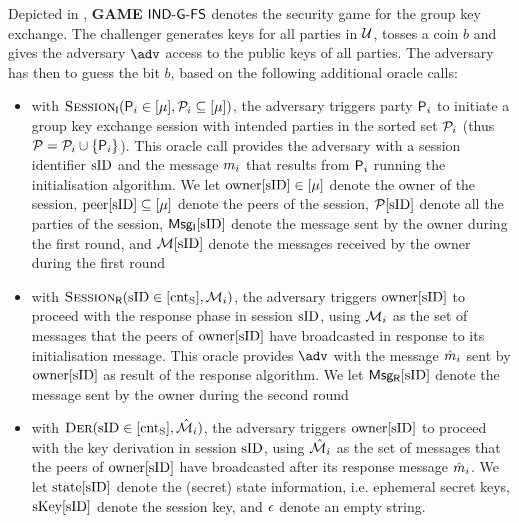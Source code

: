 Depicted in , {\textbf{GAME} $\GIAKEsecurityPFSGame$} denotes the security game for the group key exchange. 
The challenger generates keys for all parties in $\Universe$, tosses a coin $b$ and gives the adversary $\adv$ access to the public keys of all parties.
The adversary has then to guess the bit $b$, based on the following additional oracle calls:
\begin{itemize}
	\item with $\GakeIniO ( \GIni  \in [\mu], \PartySet_{i} \subseteq [\mu])$, the adversary triggers party $\User[i]$ to initiate a group key exchange session with intended parties in the sorted set $\PartySet_{i}$ (thus $\PartySet = \PartySet_{i}  \cup \{\User[i]\}$). This oracle call provides the adversary with a session identifier $\sID$ and the message $\GakeIniMes_{i}$ that results from $\User[i]$ running the initialisation algorithm. We let $\owner[\sID] \in [\mu]$ denote the owner of the session, $\peer[\sID] \subseteq[\mu]$ denote the peers of the session, $\GakeUSet[\sID]$ denote all the parties of the session, $\GIniMes[\sID]$ denote the message sent by the owner during the first round, and $\GIniMesSet[\sID]$ denote the messages received by the owner during the first round
	\item with $\GakeResO(\sID \in [\cntS], \GakeIniMesSet[{i}] )$, the adversary triggers $\owner[\sID]$ to proceed with the response phase in session $\sID$, using $\GakeIniMesSet[i]$ as the set of messages that the peers of $\owner[\sID]$ have broadcasted in response to its initialisation message. This oracle provides $\adv$ with the message $\GakeResMes_{i}$ sent by $\owner[\sID]$ as result of the response algorithm. We let $\GResMes[\sID]$ denote the message sent by the owner during the second round
	\item with $\GakeDerO(\GakeResUsID \in [\cntS],  \GakeResMesSet[{i}])$, the adversary triggers $\owner[\sID]$ to proceed with the key derivation in session $\sID$, using $\GakeResMesSet[i]$ as the set of messages that the peers of $\owner[\sID]$ have broadcasted after its response message $\GakeResMes_{i}$. We let $\Gstates[\sID]$ denote the (secret) state information, i.e. ephemeral secret keys, $\ListGakeSessKey[\sID]$ denote the session key, and $\emptystr$ denote an empty string.
\end{itemize}


